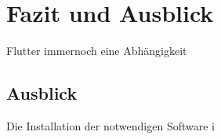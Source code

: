 \chapter{Fazit und Ausblick}
\label{chap:FazitAusblick}

Flutter immernoch eine Abhängigkeit

\section{Ausblick}
Die Installation der notwendigen Software i
